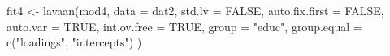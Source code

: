 \begin{Schunk}
\begin{Sinput}
 fit4 <- lavaan(mod4,
                data = dat2,
                std.lv = FALSE,
                auto.fix.first = FALSE,
                auto.var = TRUE,
                int.ov.free = TRUE,
                group = "educ",
                group.equal = c("loadings", "intercepts")
                )
\end{Sinput}
\end{Schunk}
